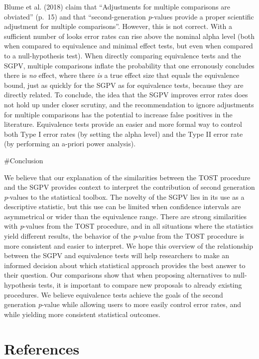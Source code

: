 \documentclass[,man,floatsintext]{apa6}
\begin{document}
Blume et al. (2018) claim that \enquote{Adjustments for multiple comparisons are obviated} (p.~15) and that \enquote{second-generation \emph{p}-values provide a proper scientific adjustment for multiple comparisons}. However, this is not correct. With a sufficient number of looks error rates can rise above the nominal alpha level (both when compared to equivalence and minimal effect tests, but even when compared to a null-hypothesis test). When directly comparing equivalence tests and the SGPV, multiple comparisons inflate the probability that one erronously concludes there is \emph{no} effect, where there \emph{is} a true effect size that equals the equivalence bound, just as quickly for the SGPV as for equivalence tests, because they are directly related. To conclude, the idea that the SGPV improves error rates does not hold up under closer scrutiny, and the recommendation to ignore adjustments for multiple comparisons has the potential to increase false positives in the literature. Equivalence tests provide an easier and more formal way to control both Type I error rates (by setting the alpha level) and the Type II error rate (by performing an a-priori power analysis).

\#Conclusion

We believe that our explanation of the similarities between the TOST procedure and the SGPV provides context to interpret the contribution of second generation \emph{p}-values to the statistical toolbox. The novelty of the SGPV lies in its use as a descriptive statistic, but this use can be limited when confidence intervals are asymmetrical or wider than the equivalence range. There are strong similarities with \emph{p}-values from the TOST procedure, and in all situations where the statistics yield different results, the behavior of the \emph{p}-value from the TOST procedure is more consistent and easier to interpret. We hope this overview of the relationship between the SGPV and equivalence tests will help researchers to make an informed decision about which statistical approach provides the best answer to their question. Our comparisons show that when proposing alternatives to null-hypothesis tests, it is important to compare new proposals to already existing procedures. We believe equivalence tests achieve the goals of the second generation \emph{p}-value while allowing users to more easily control error rates, and while yielding more consistent statistical outcomes.

\newpage

\hypertarget{references}{%
\section{References}\label{references}}
\end{document}
